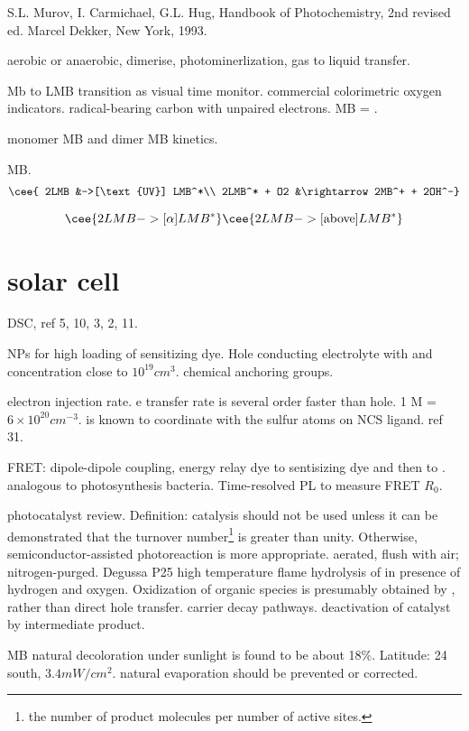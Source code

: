 S.L. Murov, I. Carmichael, G.L. Hug, Handbook of Photochemistry, 2nd revised ed. Marcel Dekker, New York, 1993.

aerobic or anaerobic, dimerise, photominerlization, gas to liquid transfer.

Mb to LMB transition as visual time monitor. commercial colorimetric oxygen indicators. radical-bearing carbon with unpaired electrons. MB = .\cite{Galagan2008}

monomer MB and dimer MB kinetics.\cite{Spencer1979}



MB. \cite{Lee2003a}
\begin{align}
\cee{ 2LMB &->[\text{UV}] LMB^*\\
2LMB^* + O2 &\rightarrow 2MB^+ + 2OH^-}
\end{align}

\[
\cee{2LMB ->[\alpha] LMB^*}
\cee{2LMB ->[\text{above}] LMB^*}
\]
\section{solar cell}

DSC, ref 5, 10, 3, 2, 11.

 NPs for high loading of sensitizing dye. Hole conducting electrolyte with  and  concentration close to $10^19 cm^3$. chemical anchoring groups.

electron injection rate. e transfer rate is several order faster than hole. 1 M = $6\times10^{20} cm^{-3}$.  is known to coordinate with the sulfur atoms on NCS ligand. ref 31.

FRET: dipole-dipole coupling, energy relay dye to sentisizing dye and then to . analogous to photosynthesis bacteria. Time-resolved PL to measure FRET $R_0$.

photocatalyst review.\cite{Mills1997} Definition: catalysis should not be used unless it can be demonstrated that the turnover number\footnote{the number of product molecules per number of active sites.} is greater than unity. Otherwise, semiconductor-assisted photoreaction is more appropriate. aerated, flush with air; nitrogen-purged. Degussa P25  high temperature flame hydrolysis of  in presence of hydrogen and oxygen. Oxidization of organic species is presumably obtained by , rather than direct hole transfer. carrier decay pathways. deactivation of catalyst by intermediate product.

MB natural decoloration under sunlight is found to be about 18\%.\cite{Nogueira1993} Latitude: 24 south, $3.4mW/cm^2$. natural evaporation should be prevented or corrected.

